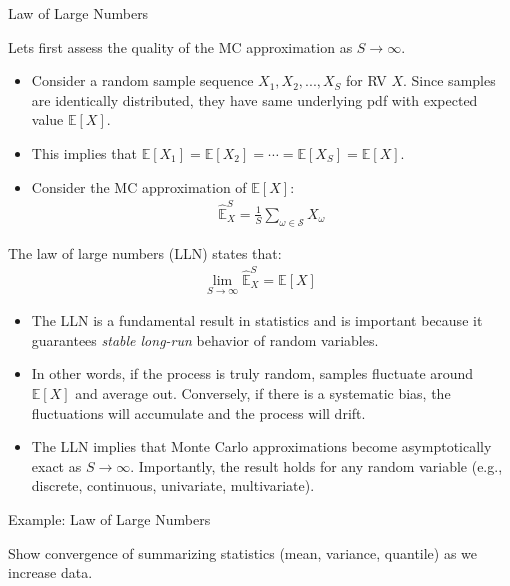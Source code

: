 \documentclass[9pt]{beamer}
\begin{document}
%
\begin{frame}{Law of Large Numbers}

Lets first assess the quality of the MC approximation as $S\to \infty$. 
\begin{itemize}
\item Consider a random sample sequence $X_1,X_2,...,X_S$ for RV $X$. Since samples are identically distributed, they have same underlying pdf with expected value $\mathbb{E}[X]$. 
\item This implies that $\mathbb{E}[X_1]=\mathbb{E}[X_2]=\cdots=\mathbb{E}[X_S]=\mathbb{E}[X]$. 
\item Consider the MC approximation of $\mathbb{E}[X]$:
\begin{align*}
\hat{\mathbb{E}}_X^S=\frac{1}{S}\sum_{\omega \in \mathcal{S}}X_\omega
\end{align*}
\end{itemize}
\begin{block}{}
The law of large numbers (LLN) states that:
\begin{align*}
\lim_{S\to \infty}\hat{\mathbb{E}}_X^S=\mathbb{E}[X]
\end{align*}
\end{block}
\begin{itemize}
\item The LLN is a fundamental result in statistics and is important because it guarantees {\em stable long-run} behavior of random variables.  

\item In other words, if the process is truly random, samples fluctuate around $\mathbb{E}[X]$ and average out.  Conversely, if there is a systematic bias, the fluctuations will accumulate and the process will drift. 

\item The LLN implies that Monte Carlo approximations become asymptotically exact as $S\to \infty$. Importantly, the result holds for any random variable (e.g., discrete, continuous, univariate, multivariate). 
\end{itemize}

\end{frame}

%
\begin{frame}{Example: Law of Large Numbers}

\begin{block}{}
{\color{red} Show convergence of summarizing statistics (mean, variance, quantile) as we increase data.}
\end{block}

\end{frame}
\end{document}
